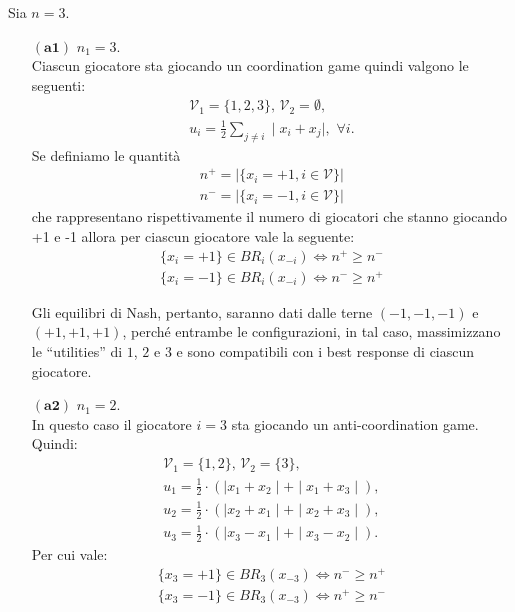 \documentclass[11pt,largemargins]{homework}
\begin{document}
\begin{alphaparts}
\questionpart
Sia $n=3$.


  
  \begin{itemize}
  
  
    \item[$\left(\textbf{a1}\right)$]  $n_{1}=3$.\\
  Ciascun giocatore sta giocando un coordination game quindi valgono le seguenti: 
  \begin{align*}
  \mathcal{V}_{1}=\{1,2,3\}, \, \mathcal{V}_{2}=\emptyset, \\
   u_{i}=\frac{1}{2}\sum_{j\neq i}\mid x_{i}+x_{j}\mid, \,\, \forall i.
  \end{align*}
  Se definiamo le quantità
  \begin{gather*}
    n^+ = | \{x_i = +1, i\in \mathcal{V}\}|\\
    n^- = | \{x_i = -1, i\in \mathcal{V}\}|
  \end{gather*}
  che rappresentano rispettivamente il numero di giocatori che stanno giocando +1 e -1 allora per ciascun giocatore vale la seguente:
  \begin{gather*}
    \{x_i = +1\} \in BR_i (x_{-i}) \iff n^+ \geq n^-\\
    \{x_i = -1\} \in BR_i (x_{-i}) \iff n^- \geq n^+
  \end{gather*}
  
  Gli equilibri di Nash, pertanto, saranno dati dalle terne $\left(-1,-1,-1\right)$ e $\left(+1,+1,+1\right)$, perché entrambe le configurazioni, in tal caso, massimizzano le ``utilities'' di $1$, $2$ e $3$ e sono compatibili con i best response di ciascun giocatore.
  
  
  \item[$\left(\textbf{a2}\right)$] $n_{1}=2$.\\%
  In questo caso il giocatore \(i = 3\) sta giocando un anti-coordination game. Quindi: 
  \begin{gather*}
  \mathcal{V}_{1}=\{1,2\}, \, \mathcal{V}_{2}=\{3\},\\
  u_{1}=\frac{1}{2}\cdot \left(\mid x_{1}+x_{2}\mid + \mid x_{1}+x_{3}\mid\right), \\ u_{2}=\frac{1}{2}\cdot \left(\mid x_{2}+x_{1}\mid + \mid x_{2}+x_{3}\mid\right), \\ u_{3}=\frac{1}{2}\cdot \left(\mid x_{3}-x_{1}\mid + \mid x_{3}-x_{2}\mid\right).
  \end{gather*}
  Per cui vale:
  \begin{gather*}
    \{x_3 = +1\} \in BR_3 (x_{-3}) \iff n^- \geq n^+\\
    \{x_3 = -1\} \in BR_3 (x_{-3}) \iff n^+ \geq n^-
  \end{gather*}



\end{itemize}
\end{alphaparts}
\end{document}
